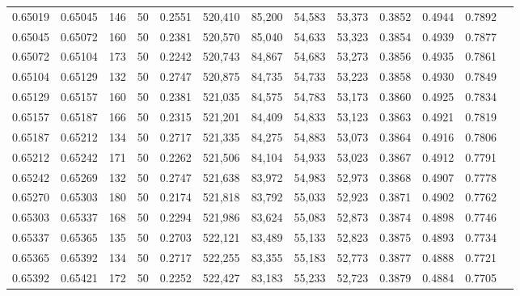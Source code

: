 \begin{tabular}{rrrrrrrrrrrrr}
0.65019 & 0.65045 &   146 &  50 &                                     0.2551 & 520,410 &  85,200 &  54,583 &  53,373 & 0.3852 & 0.4944 & 0.7892 \\
0.65045 & 0.65072 &   160 &  50 &                                     0.2381 & 520,570 &  85,040 &  54,633 &  53,323 & 0.3854 & 0.4939 & 0.7877 \\
0.65072 & 0.65104 &   173 &  50 &                                     0.2242 & 520,743 &  84,867 &  54,683 &  53,273 & 0.3856 & 0.4935 & 0.7861 \\
0.65104 & 0.65129 &   132 &  50 &                                     0.2747 & 520,875 &  84,735 &  54,733 &  53,223 & 0.3858 & 0.4930 & 0.7849 \\
0.65129 & 0.65157 &   160 &  50 &                                     0.2381 & 521,035 &  84,575 &  54,783 &  53,173 & 0.3860 & 0.4925 & 0.7834 \\
0.65157 & 0.65187 &   166 &  50 &                                     0.2315 & 521,201 &  84,409 &  54,833 &  53,123 & 0.3863 & 0.4921 & 0.7819 \\
0.65187 & 0.65212 &   134 &  50 &                                     0.2717 & 521,335 &  84,275 &  54,883 &  53,073 & 0.3864 & 0.4916 & 0.7806 \\
0.65212 & 0.65242 &   171 &  50 &                                     0.2262 & 521,506 &  84,104 &  54,933 &  53,023 & 0.3867 & 0.4912 & 0.7791 \\
0.65242 & 0.65269 &   132 &  50 &                                     0.2747 & 521,638 &  83,972 &  54,983 &  52,973 & 0.3868 & 0.4907 & 0.7778 \\
0.65270 & 0.65303 &   180 &  50 &                                     0.2174 & 521,818 &  83,792 &  55,033 &  52,923 & 0.3871 & 0.4902 & 0.7762 \\
0.65303 & 0.65337 &   168 &  50 &                                     0.2294 & 521,986 &  83,624 &  55,083 &  52,873 & 0.3874 & 0.4898 & 0.7746 \\
0.65337 & 0.65365 &   135 &  50 &                                     0.2703 & 522,121 &  83,489 &  55,133 &  52,823 & 0.3875 & 0.4893 & 0.7734 \\
0.65365 & 0.65392 &   134 &  50 &                                     0.2717 & 522,255 &  83,355 &  55,183 &  52,773 & 0.3877 & 0.4888 & 0.7721 \\
0.65392 & 0.65421 &   172 &  50 &                                     0.2252 & 522,427 &  83,183 &  55,233 &  52,723 & 0.3879 & 0.4884 & 0.7705 \\

\end{tabular}
